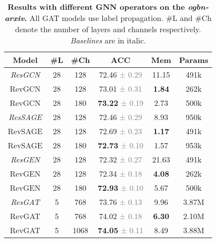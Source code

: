 \documentclass{article}
\begin{document}
\begin{table}[t]
\vspace{-8pt}
\centering
\setlength{\tabcolsep}{5pt}
\caption{\textbf{Results with different GNN operators on the \emph{ogbn-arxiv}.} All GAT models use label propagation. \#L and \#Ch denote the number of layers and channels respectively. \textit{Baselines} are in italic.}
\vspace{2pt}
\begin{tabular}{cccccc}
\toprule
  \label{table:ogbn_arxiv_ablation}
  \centering
Model & \#L & \#Ch & ACC  & Mem  & Params \\
\midrule
\textit{ResGCN} & 28 & 128 & 72.46 \textcolor{gray}{\small{± 0.29}} & 11.15
& 491k \\
RevGCN & 28 & 128 & 73.01 \textcolor{gray}{\small{± 0.31}} & \textbf{1.84}
& 262k \\
RevGCN & 28 & 180 & \textbf{73.22} \textcolor{gray}{\small{± 0.19}} & 2.73
& 500k \\
\midrule
\textit{ResSAGE} & 28 & 128 & 72.46 \textcolor{gray}{\small{± 0.29}} & 8.93
& 950k \\
RevSAGE & 28 & 128 & 72.69 \textcolor{gray}{\small{± 0.23}} & \textbf{1.17}
& 491k \\
RevSAGE & 28 & 180 & \textbf{72.73} \textcolor{gray}{\small{± 0.10}} & 1.57 
& 953k \\
\midrule
\textit{ResGEN} & 28 & 128 & 72.32 \textcolor{gray}{\small{± 0.27}} & 21.63 
& 491k \\
RevGEN & 28 & 128 & 72.34 \textcolor{gray}{\small{± 0.18}} & \textbf{4.08} 
& 262k \\
RevGEN & 28 & 180 & \textbf{72.93} \textcolor{gray}{\small{± 0.10}} & 5.67
& 500k \\
\midrule
\textit{ResGAT} & 5 & 768 & 73.76 \textcolor{gray}{\small{± 0.13}} & 9.96
& 3.87M \\
RevGAT & 5 & 768 & 74.02 \textcolor{gray}{\small{± 0.18}} & \textbf{6.30}
& 2.10M \\
RevGAT & 5 & 1068 & \textbf{74.05} \textcolor{gray}{\small{± 0.11}} & 8.49
& 3.88M \\
\bottomrule
\end{tabular}
\end{table}
\end{document}
